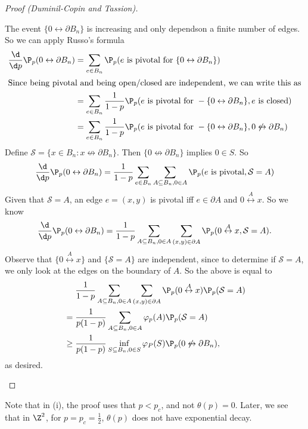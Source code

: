 \documentclass[a4paper]{article}
\begin{document}
\begin{proof}[Proof (Duminil-Copin and Tassion)]
\begin{enumerate}
      The event $\{0 \leftrightarrow \partial B_n\}$ is increasing and only dependson a finite number of edges. So we can apply Russo's formula
      \begin{align*}
        \frac{\d}{\d p} \P_p(0 \leftrightarrow \partial B_n) &= \sum_{e \in B_n} \P_p(e\text{ is pivotal for }\{0 \leftrightarrow \partial B_n\})\\
        \intertext{Since being pivotal and being open/closed are independent, we can write this as}
        &= \sum_{e \in B_n} \frac{1}{1 - p} \P_p(e\text{ is pivotal for }-\{0 \leftrightarrow \partial B_n\}, e\text{ is closed})\\
        &= \sum_{e \in B_n} \frac{1}{1 - p} \P_p(e\text{ is pivotal for }-\{0 \leftrightarrow \partial B_n\}, 0 \not\leftrightarrow \partial B_n)
      \end{align*}
      Define $\mathcal{S} = \{x \in B_n: x \not\leftrightarrow \partial B_n\}$. Then $\{0 \not\leftrightarrow \partial B_n\}$ implies $0 \in S$. So
      \[
        \frac{\d}{\d p} \P_p(0 \leftrightarrow \partial B_n) = \frac{1}{1 - p} \sum_{e \in B_n} \sum_{A \subseteq B_n, 0 \in A} \P_p(e\text{ is pivotal}, \mathcal{S} = A)
      \]
      Given that $\mathcal{S} = A$, an edge $e = (x, y)$ is pivotal iff $e \in \partial A$ and $0 \overset{A}{\leftrightarrow} x$. So we know
      \[
        \frac{\d}{\d p} \P_p(0 \leftrightarrow \partial B_n) = \frac{1}{1 - p} \sum_{A \subseteq B_n, 0 \in A} \sum_{(x, y) \in \partial A} \P_p(0 \overset{A}{\leftrightarrow} x, \mathcal{S} = A).
      \]
      Observe that $\{0 \overset{A}{\leftrightarrow} x\}$ and $\{\mathcal{S} = A\}$ are independent, since to determine if $\mathcal{S} = A$, we only look at the edges on the boundary of $A$. So the above is equal to %
      \begin{align*}
        &\hphantom{{}={}}\frac{1}{1 - p} \sum_{A \subseteq B_n, 0 \in A} \sum_{(x, y) \in \partial A} \P_p(0 \overset{A}{\leftrightarrow} x)\P_p(\mathcal{S} = A)\\
        &= \frac{1}{p(1 - p)} \sum_{A \subseteq B_n, 0 \in A} \varphi_p(A) \P_p(\mathcal{S} = A)\\
        &\geq \frac{1}{p(1 - p)} \inf_{S \subseteq B_n, 0 \in S} \varphi_P(S) \P_p(0 \not\leftrightarrow \partial B_n),
      \end{align*}
      as desired.
  \end{enumerate}
\end{proof}
Note that in (i), the proof uses that $p < p_c$, and not $\theta(p) = 0$. Later, we see that in $\Z^2$, for $p = p_c = \frac{1}{2}$, $\theta(p)$ does not have exponential decay.
\end{document}
